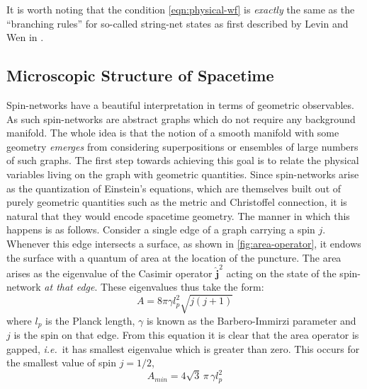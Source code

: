 \documentclass[preprint]{SciPost}
\newcommand{\ie}{\textit{i.e.}~}
\newcommand{\unit}[1]{\mathbf{\hat{#1}}}
\theoremstyle{plain} %
\begin{document}
It is worth noting that the condition \eqref{eqn:physical-wf} is \emph{exactly} the same as the ``branching rules'' for so-called string-net states as first described by Levin and Wen in \cite{Levin2004String-net}.


\subsection{Microscopic Structure of Spacetime}\label{subsec:quantum-geometry}

Spin-networks have a beautiful interpretation in terms of geometric observables. As such spin-networks are abstract graphs which do not require any background manifold. The whole idea is that the notion of a smooth manifold with some geometry \emph{emerges} from considering superpositions or ensembles of large numbers of such graphs. The first step towards achieving this goal is to relate the physical variables living on the graph with geometric quantities. Since spin-networks arise as the quantization of Einstein's equations, which are themselves built out of purely geometric quantities such as the metric and Christoffel connection, it is natural that they would encode spacetime geometry. The manner in which this happens is as follows. Consider a single edge of a graph carrying a spin $ j $. Whenever this edge intersects a surface, as shown in \autoref{fig:area-operator}, it endows the surface with a quantum of area at the location of the puncture. The area arises as the eigenvalue of the Casimir operator $ \unit{j}^2 $ acting on the state of the spin-network \emph{at that edge}. These eigenvalues thus take the form:
\begin{equation}\label{eqn:area-eigenvalue}
	A = 8 \pi \gamma l_p^2 \sqrt{j(j+1)}
\end{equation}
where $ l_p $ is the Planck length, $ \gamma $ is known as the Barbero-Immirzi parameter and $ j $ is the spin on that edge. From this equation it is clear that the area operator is gapped, \ie it has smallest eigenvalue which is greater than zero. This occurs for the smallest value of spin $ j = 1/2 $,
\begin{equation}\label{eqn:area-minimum}
	A_{min} = 4 \sqrt{3} \, \pi \, \gamma l_p^2
\end{equation}
\end{document}
